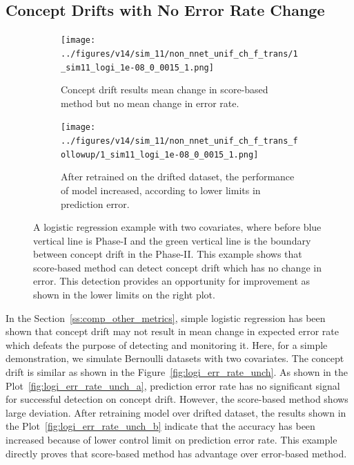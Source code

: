 \documentclass[twoside,11pt]{article}
\begin{document}
\subsection{Concept Drifts with No Error Rate Change}
\begin{figure}[!htp]
\centering
\begin{subfigure}[t]{0.49\linewidth}
         \centering
           \texttt{[image: ../figures/v14/sim\_11/non\_nnet\_unif\_ch\_f\_trans/1\_sim11\_logi\_1e-08\_0\_0015\_1.png]}
         \caption{Concept drift results mean change in score-based method but no mean change in error rate.}
         \label{fig:exp_no_err_ch_a}
  \end{subfigure}
\begin{subfigure}[t]{0.49\linewidth}
         \centering
	  \texttt{[image: ../figures/v14/sim\_11/non\_nnet\_unif\_ch\_f\_trans\_followup/1\_sim11\_logi\_1e-08\_0\_0015\_1.png]}
         \caption{After retrained on the drifted dataset, the performance of model increased, according to lower limits in prediction error.}
         \label{fig:exp_no_err_ch_b}
  \end{subfigure}
  \caption{A logistic regression example with two covariates, where before blue vertical line is Phase-I and the green vertical line is the boundary between concept drift in the Phase-II. This example shows that score-based method can detect concept drift which has no change in error. This detection provides an opportunity for improvement as shown in the lower limits on the right plot.}
  \label{fig:exp_no_err_ch}
\end{figure}
In the Section~\ref{ss:comp_other_metrics}, simple logistic regression has been shown that concept drift may not result in mean change in expected error rate which defeats the purpose of detecting and monitoring it. Here, for a simple demonstration, we simulate Bernoulli datasets with two covariates. The concept drift is similar as shown in the Figure~\ref{fig:logi_err_rate_unch}. As shown in the Plot~\ref{fig:logi_err_rate_unch_a}, prediction error rate has no significant signal for successful detection on concept drift. However, the score-based method shows large deviation. After retraining model over drifted dataset, the results shown in the Plot~\ref{fig:logi_err_rate_unch_b} indicate that the accuracy has been increased because of lower control limit on prediction error rate. This example directly proves that score-based method has advantage over error-based method. 
\end{document}
